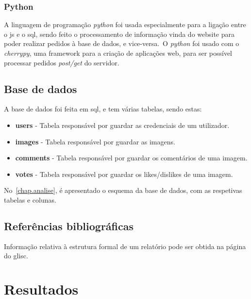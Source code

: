 \documentclass{report}
\begin{document}
\subsection{Python}\label{subsec:python}
    A linguagem de programação \textit{python} foi usada especialmente para a ligação entre o \ac{js} e o \ac{sql}, sendo feito o processamento de informação vinda do website para poder realizar pedidos à base de dados, e vice-versa.\ O \textit{python} foi usado com o \textit{cherrypy}, uma framework para a criação de aplicações web, para ser possível processar pedidos \textit{post/get} do servidor.

\section{Base de dados}\label{sec:base-de-dados}
    A base de dados foi feita em \ac{sql}, e tem várias tabelas, sendo estas:
    \begin{itemize}
        \item \textbf{users} - Tabela responsável por guardar as credenciais de um utilizador.
        \item \textbf{images} - Tabela responsável por guardar as imagens.
        \item \textbf{comments} - Tabela responsável por guardar os comentários de uma imagem.
        \item \textbf{votes} - Tabela responsável por guardar os likes/dislikes de uma imagem.
    \end{itemize}
    No~\ref{chap.analise}, é apresentado o esquema da base de dados, com as respetivas tabelas e colunas.

\newpage

%

\section{Referências bibliográficas}\label{sec:referencias-bibliograficas}
Informação relativa à estrutura formal de um relatório pode ser obtida
na página do \ac{glisc}\cite{glisc}.

\chapter{Resultados}
\label{chap.resultados}
\end{document}
